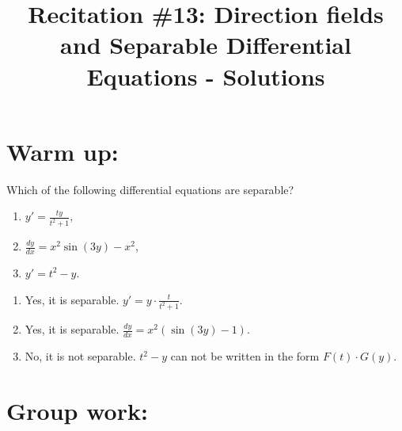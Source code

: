 \documentclass[noinstructornotes]{ximera}
\title{Recitation \#13: Direction fields and Separable Differential Equations - Solutions}
\begin{document}
\begin{abstract}		\end{abstract}
\maketitle




\section{Warm up:}
	Which of the following differential equations are separable?
	\begin{enumerate}
	\item $y' = \frac{ty}{t^2+1}$,
	\item $\frac{dy}{dx} =x^2 \sin (3y) -x^2$,
	\item $y' = t^2 - y$.
	\end{enumerate}

	\begin{freeResponse}
	\begin{enumerate}
	\item Yes, it is separable. $y' = y \cdot \frac{t}{t^2+1}$.
	\item Yes, it is separable. $\frac{dy}{dx} = x^2 \left( \sin(3y)-1 \right)$.
	\item No, it is not separable. $t^2-y$ can not be written in the form $F(t) \cdot G(y)$. 
	\end{enumerate}
	\end{freeResponse}
	
\begin{instructorNotes}

\end{instructorNotes}








\section{Group work:}
\end{document}
